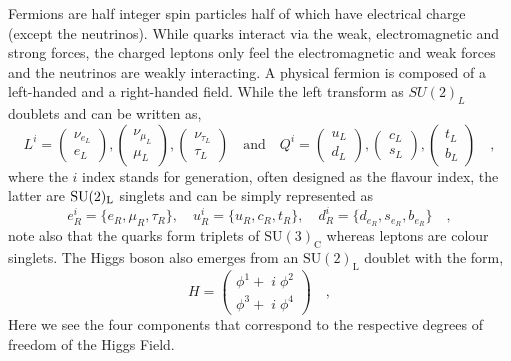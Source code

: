 Fermions are half integer spin particles half of which have electrical charge (except the neutrinos).  While quarks interact via the weak, electromagnetic and strong forces, the charged leptons only feel the electromagnetic and weak forces and the neutrinos are weakly interacting.  
%
A physical fermion is composed of a left-handed and a right-handed field. While the left transform as $SU(2)_L$ doublets and can be written as,
%
\begin{equation}
L^i= \begin{pmatrix}
\nu_{e_L} \\ e_L 
\end{pmatrix},
\begin{pmatrix}
\nu_{\mu_L} \\ \mu_L 
\end{pmatrix},
\begin{pmatrix}
\nu_{\tau_L} \\ \tau_L 
\end{pmatrix} 
\quad 
\text{and} \quad Q^i= \begin{pmatrix}
u_{L} \\
d_L 
\end{pmatrix},\begin{pmatrix}
c_{L} \\
s_L 
\end{pmatrix}
,\begin{pmatrix}
t_{L} \\
b_L 
\end{pmatrix} \quad ,
\end{equation}
where the $i$ index stands for generation, often designed as the flavour index, the latter are $\mathrm{SU}(2)_{\mathrm{L}}$ singlets and can be simply represented as
%
 \begin{equation}
e^i_R=\{e_R,\mu_R,\tau_R\}, \quad  u^i_R=\{u_R,c_R,t_R\}, \quad d^i_R=\{d_{e_R},s_{e_R},b_{e_R}\} \quad , 
\end{equation}
%
note also that the quarks form triplets of $\mathrm{SU(3)_C}$ whereas leptons are colour singlets. The Higgs boson also emerges from an $\mathrm{SU(2)_L}$ doublet with the form,
%
\begin{equation}
H=\begin{pmatrix}
\phi^1 + \; i \; \phi^2 \\
\phi^3 + \; i \; \phi^4  
\end{pmatrix} \quad , 
\end{equation}
%
%
Here we see the four components that correspond to the respective degrees of freedom of the Higgs Field.
